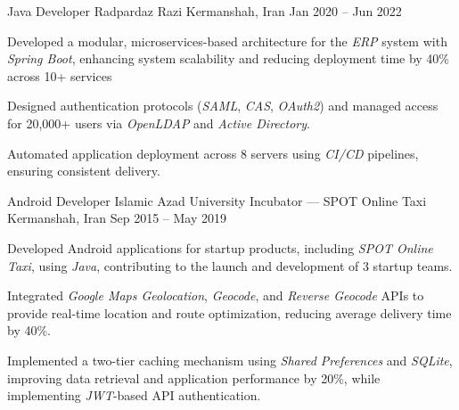 \begin{cventries}
  \cventry
    {Java Developer} %
    {Radpardaz Razi} %
    {Kermanshah, Iran} %
    {Jan 2020 -- Jun 2022} %
    {
      \begin{cvitems}
        \item Developed a modular, microservices-based architecture for the \textit{ERP} system with \textit{Spring Boot}, enhancing system scalability and reducing deployment time by 40\% across 10+ services
        \item Designed authentication protocols (\textit{SAML}, \textit{CAS}, \textit{OAuth2}) and managed access for 20,000+ users via \textit{OpenLDAP} and \textit{Active Directory}.
        \item Automated application deployment across 8 servers using \textit{CI/CD} pipelines, ensuring consistent delivery.
      \end{cvitems}
    }

  \cventry
    {Android Developer}
    {Islamic Azad University Incubator --- SPOT Online Taxi}
    {Kermanshah, Iran}
    {Sep 2015 -- May 2019}
    {
      \begin{cvitems}
        \item Developed Android applications for startup products, including \textit{SPOT Online Taxi}, using \textit{Java}, contributing to the launch and development of 3 startup teams.
        \item Integrated \textit{Google Maps Geolocation}, \textit{Geocode}, and \textit{Reverse Geocode} APIs to provide real-time location and route optimization, reducing average delivery time by 40\%.
        \item Implemented a two-tier caching mechanism using \textit{Shared Preferences} and \textit{SQLite}, improving data retrieval and application performance by 20\%, while implementing \textit{JWT}-based API authentication.
      \end{cvitems}
    }


\end{cventries}
